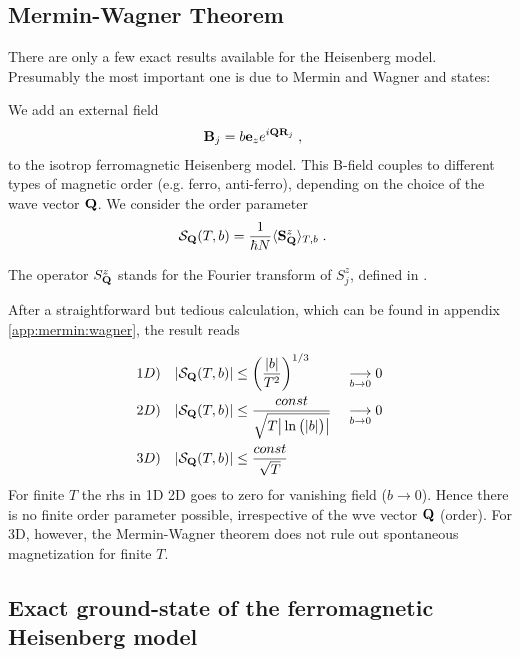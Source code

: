 \subsection{Mermin-Wagner Theorem}
%
There are only a few exact results available for the Heisenberg model. Presumably the most important one is due to Mermin and Wagner and states:

We add an external field 
\begin{align*}
\mathbf B_{j} &= b \mathbf e_{z} e^{i \mathbf Q \mathbf R_{j}}\;,
\end{align*}
%
to the isotrop ferromagnetic Heisenberg model.
This B-field  couples to different types of magnetic order (e.g. ferro, anti-ferro), depending on the choice of the wave vector $\mathbf Q$. 
%
We consider the order parameter 
%
\begin{align}
{\cal S}_{\mathbf Q}(T,b) &= \frac{1}{\hbar N}\langle \mathbf S^{z}_{\mathbf Q}\rangle_{T,b}\;.
\end{align}

The operator $S^{z}_{\mathbf Q}$ stands for the Fourier transform of $S_{j}^{z}$, defined in .

After a straightforward but tedious calculation, which can be found in appendix \ref{app:mermin:wagner}, the result reads
%

\begin{subequations}\label{eq:}
\begin{align}
1D) &&\abs{{\cal S}_{\mathbf Q}(T,b)}&\le \bigg(\frac{  \abs{b}}{T^{2}}\bigg)^{1/3} &&\underset{b\to 0}{\longrightarrow} 0\\
2D) &&\abs{{\cal S}_{\mathbf Q}(T,b)}&\le 
\frac{const}{\sqrt{T
  \big|  \ln\big( \abs{b}  \big)\big| }}&&\underset{b\to 0}{\longrightarrow} 0\\
3D) &&  \abs{{\cal S}_{\mathbf Q}(T,b)} &\le \frac{const}{\sqrt{T}}
\end{align}
\end{subequations}
%
For finite $T$ the rhs in 1D 2D goes to zero for vanishing field ($b\to 0$).
Hence there is no finite order parameter possible, irrespective of the wve vector $\mathbf Q$ (order). 
For 3D, however, the Mermin-Wagner theorem does not rule out spontaneous  magnetization for finite $T$.



 
 \subsection{Exact ground-state of the ferromagnetic Heisenberg model}

